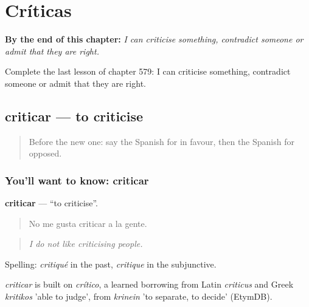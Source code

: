 
\chapter{Críticas}
\label{ch:es-criticas}

\begin{chapteropening}
\textbf{By the end of this chapter:} \emph{I can criticise something, contradict someone or admit that they are right.}

Complete the last lesson of chapter 579: I can criticise something, contradict someone or admit that they are right.
\end{chapteropening}

\section[criticar]{criticar — to criticise}

\label{lesson:ES-C579-criticar}



\begin{quote}
Before the new one: say the Spanish for in favour, then the Spanish for opposed.
\end{quote}

\subsection*{You'll want to know: criticar}
\textbf{criticar} — \textquotedblleft{}to criticise\textquotedblright{}.

\begin{quote}
No me gusta criticar a la gente.
\end{quote}

\begin{quote}
\emph{I do not like criticising people.}
\end{quote}

Spelling: \emph{critiqué} in the past, \emph{critique} in the subjunctive.

\begin{cousinweb}
\emph{criticar} is built on \emph{crítico}, a learned borrowing from Latin \emph{criticus} and Greek \emph{kritikos} 'able to judge', from \emph{krinein} 'to separate, to decide' (EtymDB).
\end{cousinweb}

